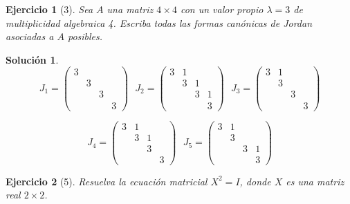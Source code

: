 \documentclass[11pt, a4paper]{article}
\newif\IfInSansMode
\numberwithin{equation}{section}
\theoremstyle{theorem-style}
\theoremstyle{definition-style}
\newtheorem{ejer}{Ejercicio}[section]
\theoremstyle{remark-style}
\newtheorem*{sol}{Solución}
\theoremstyle{example-style}
\begin{document}
    \begin{ejer}[3] 
        Sea $A$ una matriz $4 \times 4$ con un valor propio $\lambda = 3$ de
        multiplicidad algebraica 4. Escriba todas las formas canónicas de Jordan
        asociadas a $A$ posibles.
    \end{ejer}

    \begin{sol}
        $$J_1 =
        \begin{pmatrix}
            3 & & & \\
              & 3 & & \\
              & & 3 & \\
              & & & 3 
        \end{pmatrix} \ \ \ 
        J_2 =
        \begin{pmatrix}
            3 & 1 & & \\
              & 3 & 1 & \\
              & & 3 & 1 \\
              & & & 3 
        \end{pmatrix} \ \ \
        J_3 =
        \begin{pmatrix}
            3 & 1 & & \\
              & 3 & & \\
              & & 3 & \\
              & & & 3 
        \end{pmatrix}$$

        $$J_4 = 
        \begin{pmatrix}
            3 & 1 & & \\
              & 3 & 1 & \\
              & & 3 & \\
              & & & 3 
        \end{pmatrix} \ \ \
        J_5 =
        \begin{pmatrix}
            3 & 1 & & \\
              & 3 & & \\
              & & 3 & 1 \\
              & & & 3 
        \end{pmatrix}$$
    \end{sol}

    \begin{ejer}[5]
        Resuelva la ecuación matricial $X^2 = I$, donde $X$ es una matriz real $2
        \times 2$.
    \end{ejer}
\end{document}
